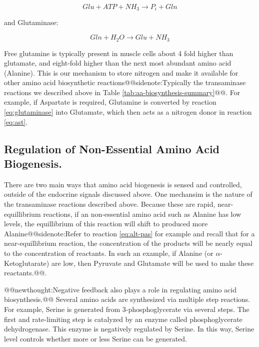 \documentclass{tufte-handout}
\makeatletter
\def\newthought#1{@@newthought:#1@@}
\def\sidenote#1{@@sidenote:#1@@}
\makeatother
\begin{document}
\begin{equation}
Glu + ATP +  NH_3 \rightarrow  P_i + Gln
\end{equation}

and Glutaminase:

\begin{equation}\label{eq:glutaminase} 
Gln + H_2O \rightarrow Glu + NH_3
\end{equation}

Free glutamine is typically present in muscle cells about 4 fold higher than glutamate, and eight-fold higher than the next most abundant amino acid (Alanine).  This is our mechanism to store nitrogen and make it available for other amino acid biosynthetic reactions\sidenote{Typically the transaminase reactions we described above in Table \ref{tab:aa-biosynthesis-summary}}.  For example, if Aspartate is required, Glutamine is converted by reaction \ref{eq:glutaminase} into Glutamate, which then acts as a nitrogen donor in reaction \ref{eq:ast}.

\subsection{Regulation of Non-Essential Amino Acid Biogenesis.}

There are two main ways that amino acid biogenesis is sensed and controlled, outside of the endocrine signals discussed above.  One mechansim is the nature of the transaminase reactions described above.  Because these are rapid, near-equillibrium reactions, if an non-essential amino acid such as Alanine has low levels, the equillibrium of this reaction will shift to produced more Alanine\sidenote{Refer to reaction  \ref{eq:alt-pas} for example and recall that for a near-equillibrium reaction, the concentration of the products will be nearly equal to the concentration of reactants.  In such an example, if Alanine (or $\alpha$-Ketoglutarate) are low, then Pyruvate and Glutamate will be used to make these reactants.}.

\newthought{Negative feedback also plays a role in regulating amino acid biosynthesis.}  Several amino acids are synthesized via multiple step reactions.  For example, Serine is generated from 3-phosphoglycerate via several steps.  The first and rate-limiting step is catalyzed by an enzyme called phosphoglycerate dehydrogenase.  This enzyme is negatively regulated by Serine.  In this way, Serine level controls whether more or less Serine can be generated.
\end{document}
